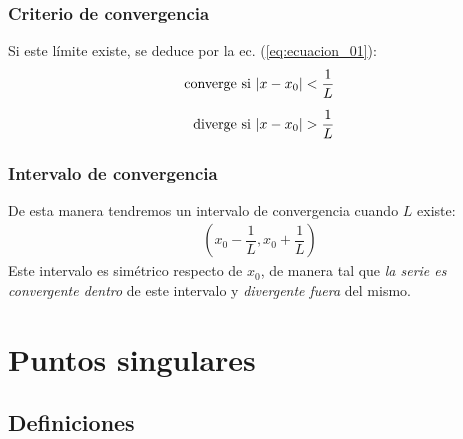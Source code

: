 \documentclass[12pt]{beamer}
\begin{document}
\begin{frame}
\frametitle{Criterio de convergencia}
Si este límite existe, se deduce por la ec. (\ref{eq:ecuacion_01}):
\pause
\begin{align}
\begin{aligned}        
\mbox{converge si } &\abs{x - x_{0}} < \dfrac{1}{L} \\[0.5em]
\mbox{diverge si } &\abs{x - x_{0}} > \dfrac{1}{L}
\end{aligned}
\label{eq:ecuacion_02}    
\end{align}
\end{frame}
\begin{frame}
\frametitle{Intervalo de convergencia}
De esta manera tendremos un intervalo de convergencia cuando $L$ existe:
\pause
\begin{align*}
\left( x_{0} - \dfrac{1}{L}, x_{0} + \dfrac{1}{L} \right)
\end{align*}
\pause
Este intervalo es simétrico respecto de $x_{0}$, de manera tal que \emph{la serie es convergente dentro} de este intervalo y \emph{divergente fuera} del mismo.
\end{frame}

\section{Puntos singulares}
\subsection{Definiciones}
\end{document}
